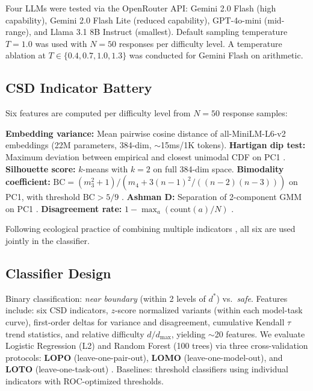 \documentclass[11pt,letterpaper]{article}
\begin{document}
Four LLMs were tested via the OpenRouter API: Gemini 2.0 Flash (high capability), Gemini 2.0 Flash Lite (reduced capability), GPT-4o-mini (mid-range), and Llama 3.1 8B Instruct (smallest). Default sampling temperature $T{=}1.0$ was used with $N{=}50$ responses per difficulty level. A temperature ablation at $T \in \{0.4, 0.7, 1.0, 1.3\}$ was conducted for Gemini Flash on arithmetic.

\subsection{CSD Indicator Battery}

Six features are computed per difficulty level from $N{=}50$ response samples:

\textbf{Embedding variance:} Mean pairwise cosine distance of all-MiniLM-L6-v2 embeddings \cite{reimers2019} (22M parameters, 384-dim, ${\sim}$15ms/1K tokens). \textbf{Hartigan dip test:} Maximum deviation between empirical and closest unimodal CDF on PC1 \cite{hartigan1985}. \textbf{Silhouette score:} $k$-means with $k{=}2$ on full 384-dim space. \textbf{Bimodality coefficient:} $\text{BC} = (m_3^2 + 1)/(m_4 + 3(n{-}1)^2/((n{-}2)(n{-}3)))$ on PC1, with threshold $\text{BC} > 5/9$ \cite{freeman2013, kang2019}. \textbf{Ashman D:} Separation of 2-component GMM on PC1 \cite{ashman1994}. \textbf{Disagreement rate:} $1 - \max_a(\text{count}(a)/N)$ \cite{wang2023selfconsistency}.

Following ecological practice of combining multiple indicators \cite{dakos2012methods, ghadami2022}, all six are used jointly in the classifier.

\subsection{Classifier Design}

Binary classification: \emph{near boundary} (within 2 levels of $d^*$) vs.\ \emph{safe}. Features include: six CSD indicators, $z$-score normalized variants (within each model-task curve), first-order deltas for variance and disagreement, cumulative Kendall $\tau$ trend statistics, and relative difficulty $d/d_{\max}$, yielding ${\sim}$20 features. We evaluate Logistic Regression (L2) and Random Forest (100 trees) via three cross-validation protocols: \textbf{LOPO} (leave-one-pair-out), \textbf{LOMO} (leave-one-model-out), and \textbf{LOTO} (leave-one-task-out) \cite{dakos2012robustness}. Baselines: threshold classifiers using individual indicators with ROC-optimized thresholds.
\end{document}
